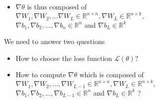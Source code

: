 \begin{frame}
\begin{overlayarea}{\textwidth}{\textheight}
\begin{itemize}
      \item<10-> $\nabla \theta$ is thus composed of \\
          $\nabla W_1, \nabla W_2, ... \nabla W_L \in \mathbb{R}^{n \times n}, \nabla W_{L} \in \mathbb{R}^{n \times k},$ \\
          $\nabla b_1, \nabla b_2, ..., \nabla b_n \in \mathbb{R}^n $ and $\nabla b_{L} \in \mathbb{R}^k$
    \end{itemize}
  \end{overlayarea}
\end{frame}

\begin{frame}
  \begin{block}{We need to answer two questions}
    \begin{itemize}
      \item<2-> How to choose the loss function $\mathscr{L}(\theta)$?
      \item<3-> How to compute $\nabla \theta$ which is composed of $\nabla W_1, \nabla W_2, ..., \nabla W_{L-1} \in \mathbb{R}^{n \times n}, \nabla W_L \in \mathbb{R}^{n \times k},$ \\ $\nabla b_1, \nabla b_2, ..., \nabla b_{L-1} \in \mathbb{R}^n $ and $\nabla b_L \in \mathbb{R}^k$ ?
    \end{itemize}
  \end{block}
\end{frame}

